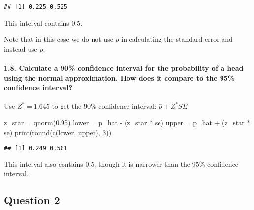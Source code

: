 \documentclass[
]{article}
\newenvironment{Shaded}{\begin{snugshade}}{\end{snugshade}}
\newcommand{\DecValTok}[1]{\textcolor[rgb]{0.00,0.00,0.81}{#1}}
\newcommand{\FloatTok}[1]{\textcolor[rgb]{0.00,0.00,0.81}{#1}}
\newcommand{\FunctionTok}[1]{\textcolor[rgb]{0.00,0.00,0.00}{#1}}
\newcommand{\NormalTok}[1]{#1}
\newcommand{\OtherTok}[1]{\textcolor[rgb]{0.56,0.35,0.01}{#1}}
\newcommand{\SpecialCharTok}[1]{\textcolor[rgb]{0.00,0.00,0.00}{#1}}
\begin{document}
\begin{verbatim}
## [1] 0.225 0.525
\end{verbatim}

This interval contains 0.5.

Note that in this case we do not use \(p\) in calculating the standard
error and instead use \(\hat{p}\).

\hypertarget{calculate-a-90-confidence-interval-for-the-probability-of-a-head-using-the-normal-approximation.-how-does-it-compare-to-the-95-confidence-interval}{%
\paragraph{1.8. Calculate a 90\% confidence interval for the probability
of a head using the normal approximation. How does it compare to the
95\% confidence
interval?}\label{calculate-a-90-confidence-interval-for-the-probability-of-a-head-using-the-normal-approximation.-how-does-it-compare-to-the-95-confidence-interval}}

Use \(Z^*=1.645\) to get the 90\% confidence interval:
\(\hat{p} \pm Z^* SE\)

\begin{Shaded}
\begin{Highlighting}[]
\NormalTok{z\_star }\OtherTok{=} \FunctionTok{qnorm}\NormalTok{(}\FloatTok{0.95}\NormalTok{)}
\NormalTok{lower }\OtherTok{=}\NormalTok{ p\_hat }\SpecialCharTok{{-}}\NormalTok{ (z\_star }\SpecialCharTok{*}\NormalTok{ se)}
\NormalTok{upper }\OtherTok{=}\NormalTok{ p\_hat }\SpecialCharTok{+}\NormalTok{ (z\_star }\SpecialCharTok{*}\NormalTok{ se)}
\FunctionTok{print}\NormalTok{(}\FunctionTok{round}\NormalTok{(}\FunctionTok{c}\NormalTok{(lower, upper), }\DecValTok{3}\NormalTok{))}
\end{Highlighting}
\end{Shaded}

\begin{verbatim}
## [1] 0.249 0.501
\end{verbatim}

This interval also contains 0.5, though it is narrower than the 95\%
confidence interval.

\hypertarget{question-2}{%
\subsection{Question 2}\label{question-2}}
\end{document}
